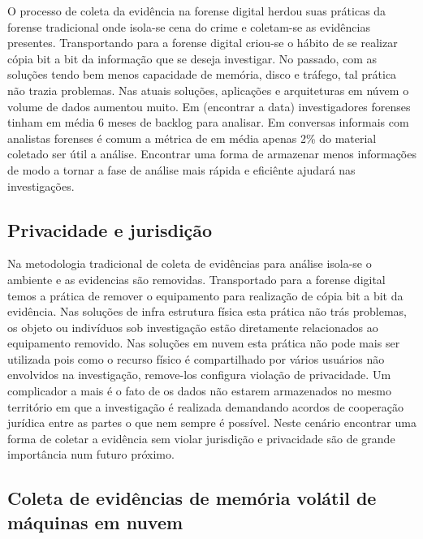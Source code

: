 O processo de coleta da evidência na forense digital herdou suas práticas da forense tradicional onde isola-se cena do crime e coletam-se as evidências presentes. 
%
Transportando para a forense digital criou-se o hábito de se realizar cópia bit a bit da informação que se deseja investigar. 
%
No passado, com as soluções tendo bem menos capacidade de memória, disco e tráfego, tal prática não trazia problemas. Nas atuais soluções, aplicações e arquiteturas em núvem o volume de dados aumentou  muito.
%
Em (encontrar a data) investigadores forenses tinham em média 6 meses de backlog para analisar. Em conversas informais com analistas forenses é comum a métrica de em média apenas 2\% do material coletado ser útil a análise.
%
Encontrar uma forma de armazenar menos informações de modo a tornar a fase de análise mais rápida e eficiênte ajudará nas investigações.

\subsection{Privacidade e jurisdição}
\label{sec:violacaoprivacidadejuriscdicao}

Na metodologia tradicional de coleta de evidências para análise isola-se o ambiente e as evidencias são removidas. Transportado para a forense digital temos a prática de remover o equipamento para realização de cópia bit a bit da evidência.
%
Nas soluções de infra estrutura física esta prática não trás problemas, os objeto ou indivíduos sob investigação estão diretamente relacionados ao equipamento removido. 
%
Nas soluções em nuvem esta prática não pode mais ser utilizada pois como o recurso físico é compartilhado por vários usuários não envolvidos na investigação, remove-los configura violação de privacidade.
%
Um complicador a mais é o fato de os dados não estarem armazenados no mesmo território em que a investigação é realizada demandando acordos de cooperação jurídica entre as partes o que nem sempre é possível.
%
Neste cenário encontrar uma forma de coletar a evidência sem violar jurisdição e privacidade são de grande importância num futuro próximo.

\subsection{Coleta de evidências de memória volátil de máquinas em nuvem}
\label{sec:forensenuvem}

